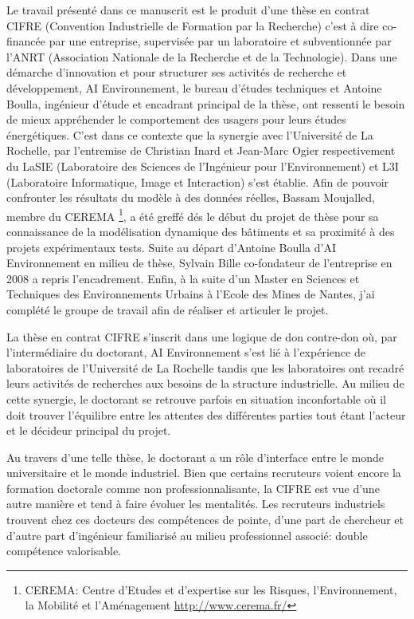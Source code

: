 Le travail présenté dans ce manuscrit est le produit d'une thèse en contrat CIFRE (Convention Industrielle de Formation par la Recherche) c'est à dire co-financée par une entreprise, supervisée par un laboratoire et subventionnée par l'ANRT (Association Nationale de la Recherche et de la Technologie). Dans une démarche d'innovation et pour structurer ses activités de recherche et développement, AI Environnement, le bureau d'études techniques et Antoine Boulla, ingénieur d'étude et encadrant principal de la thèse, ont ressenti le besoin de mieux appréhender le comportement des usagers pour leurs études énergétiques. C'est dans ce contexte que la synergie avec l'Université de La Rochelle, par l'entremise de Christian Inard et Jean-Marc Ogier respectivement du LaSIE (Laboratoire des Sciences de l'Ingénieur pour l'Environnement) et L3I (Laboratoire Informatique, Image et Interaction) s'est établie. Afin de pouvoir confronter les résultats du modèle à des données réelles, Bassam Moujalled, membre du CEREMA \footnote{CEREMA: Centre d'Etudes et d'expertise sur les Risques, l'Environnement, la Mobilité et l'Aménagement \url{http://www.cerema.fr/}}, a été greffé dés le début du projet de thèse pour sa connaissance de la modélisation dynamique des bâtiments et sa proximité à des projets expérimentaux tests. Suite au départ d'Antoine Boulla d'AI Environnement en milieu de thèse, Sylvain Bille co-fondateur de l'entreprise en 2008 a repris l'encadrement. Enfin, à la suite d'un Master en Sciences et Techniques des Environnements Urbains à l'Ecole des Mines de Nantes, j'ai complété le groupe de travail afin de réaliser et articuler le projet.

La thèse en contrat CIFRE s'inscrit dans une logique de don contre-don où, par l'intermédiaire du doctorant, AI Environnement s'est lié à l'expérience de laboratoires de l'Université de La Rochelle tandis que les laboratoires ont recadré leurs activités de recherches aux besoins de la structure industrielle. Au milieu de cette synergie, le doctorant se retrouve parfois en situation inconfortable où il doit trouver l'équilibre entre les attentes des différentes parties tout étant l'acteur et le décideur principal du projet.

Au travers d'une telle thèse, le doctorant a un rôle d'interface entre le monde universitaire et le monde industriel. Bien que certains recruteurs voient encore la formation doctorale comme non professionnalisante, la CIFRE est vue d'une autre manière et tend à faire évoluer les mentalités. Les recruteurs industriels trouvent chez ces docteurs des compétences de pointe, d'une part de chercheur et d'autre part d'ingénieur familiarisé au milieu professionnel associé: double compétence valorisable.

